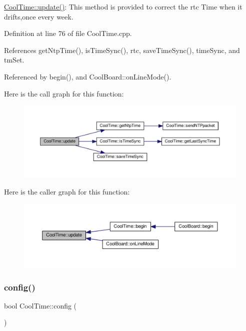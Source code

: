 \hyperlink{class_cool_time_aae601f795452cfa48d9fb337aed483a8}{Cool\+Time\+::update()}\+: This method is provided to correct the rtc Time when it drifts,once every week. 

Definition at line 76 of file Cool\+Time.\+cpp.



References get\+Ntp\+Time(), is\+Time\+Sync(), rtc, save\+Time\+Sync(), time\+Sync, and tm\+Set.



Referenced by begin(), and Cool\+Board\+::on\+Line\+Mode().

Here is the call graph for this function\+:
\nopagebreak
\begin{figure}[H]
\begin{center}
\leavevmode
\includegraphics[width=350pt]{d6/d49/class_cool_time_aae601f795452cfa48d9fb337aed483a8_cgraph}
\end{center}
\end{figure}
Here is the caller graph for this function\+:
\nopagebreak
\begin{figure}[H]
\begin{center}
\leavevmode
\includegraphics[width=350pt]{d6/d49/class_cool_time_aae601f795452cfa48d9fb337aed483a8_icgraph}
\end{center}
\end{figure}
\mbox{\label{class_cool_time_a87c28260c1bc77091162cbcf1ee2e129}} 
\subsubsection{\texorpdfstring{config()}{config()}\hspace{0.1cm}{\footnotesize\ttfamily [1/2]}}
{\footnotesize\ttfamily bool Cool\+Time\+::config (\begin{DoxyParamCaption}{ }\end{DoxyParamCaption})}

